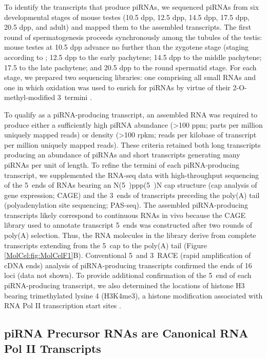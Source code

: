     To identify the transcripts that produce piRNAs, we sequenced piRNAs from six developmental stages of mouse testes (10.5 dpp, 12.5 dpp, 14.5 dpp, 17.5 dpp, 20.5 dpp, and adult) and mapped them to the assembled transcripts. The first round of spermatogenesis proceeds synchronously among the tubules of the testis: mouse testes at 10.5 dpp advance no further than the zygotene stage (staging according to \citep{NEBEL1961}; 12.5 dpp to the early pachytene; 14.5 dpp to the middle pachytene; 17.5 to the late pachytene; and 20.5 dpp to the round spermatid stage. For each stage, we prepared two sequencing libraries: one comprising all small RNAs and one in which oxidation was used to enrich for piRNAs by virtue of their 2\textprime-O-methyl-modified 3\textprime~termini \citep{Ghildiyal2008}.

    To qualify as a piRNA-producing transcript, an assembled RNA was required to produce either a sufficiently high piRNA abundance (>100 ppm; parts per million uniquely mapped reads) or density (>100 rpkm; reads per kilobase of transcript per million uniquely mapped reads). These criteria retained both long transcripts producing an abundance of piRNAs and short transcripts generating many piRNAs per unit of length. To refine the termini of each piRNA-producing transcript, we supplemented the RNA-seq data with high-throughput sequencing of the 5\textprime~ends of RNAs bearing an N(5\textprime~)ppp(5\textprime~)N cap structure (cap analysis of gene expression; CAGE) and the 3\textprime~ends of transcripts preceding the poly(A) tail (polyadenylation site sequencing; PAS-seq). The assembled piRNA-producing transcripts likely correspond to continuous RNAs in vivo because the CAGE library used to annotate transcript 5\textprime~ends was constructed after two rounds of poly(A) selection. Thus, the RNA molecules in the library derive from complete transcripts extending from the 5\textprime~cap to the poly(A) tail (Figure \ref{MolCel:fig:MolCelF1}B). Conventional 5\textprime~and 3\textprime~RACE (rapid amplification of cDNA ends) analysis of piRNA-producing transcripts confirmed the ends of 16 loci (data not shown). To provide additional confirmation of the 5\textprime~end of each piRNA-producing transcript, we also determined the locations of histone H3 bearing trimethylated lysine 4 (H3K4me3), a histone modification associated with RNA Pol II transcription start sites \cite{Guenther2007}.

  \subsection{piRNA Precursor RNAs are Canonical RNA Pol II Transcripts}
    \label{MolCel:subsec:Precursors are Pol II Txs}

